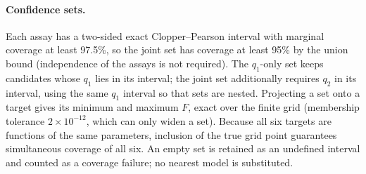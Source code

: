 \paragraph{Confidence sets.} Each assay has a two-sided exact Clopper--Pearson
interval \citep{clopper1934} with marginal coverage at least 97.5\%, so the joint
set has coverage at least 95\% by the union bound (independence of the assays is
not required). The $q_1$-only set keeps candidates whose $q_1$ lies in its
interval; the joint set additionally requires $q_2$ in its interval, using the
same $q_1$ interval so that sets are nested. Projecting a set onto a target gives
its minimum and maximum $F$, exact over the finite grid (membership tolerance
$2\times10^{-12}$, which can only widen a set). Because all six targets are
functions of the same parameters, inclusion of the true grid point guarantees
simultaneous coverage of all six. An empty set is retained as an undefined
interval and counted as a coverage failure; no nearest model is substituted.

